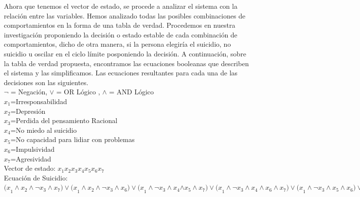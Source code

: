 {{{{{Ahora que tenemos el vector de estado, se procede a analizar el sistema con la relación entre las variables. Hemos analizado todas las posibles combinaciones de comportamientos en la forma de una tabla de verdad. Procedemos en nuestra investigación proponiendo la decisión o estado estable de cada combinación de comportamientos, dicho de otra manera, si la persona elegiría el suicidio, no suicidio u oscilar en el ciclo límite posponiendo la decisión. A continuación, sobre la tabla de verdad propuesta, encontramos las ecuaciones booleanas que describen el sistema y las simplificamos. Las ecuaciones resultantes para cada una de las decisiones son las siguientes.\\

$\neg$ = Negación, $\vee$ = OR Lógico , $\wedge$ = AND Lógico\\

$x_1$=Irresponsabilidad\\
$x_2$=Depresión\\
$x_3$=Perdida del pensamiento Racional\\
$x_4$=No miedo al suicidio\\
$x_5$=No capacidad para lidiar con problemas\\
$x_6$=Impulsividad\\
$x_7$=Agresividad\\

Vector de estado: $x_1x_2x_3x_4x_5x_6x_7$\\

Ecuación de Suicidio:
${ (x }_{ 1 }\wedge { x }_{ 2 }\wedge { \neg x }_{ 3 }\wedge { x }_{ 7 })\vee { (x }_{ 1 }\wedge { x }_{ 2 }\wedge { \neg x }_{ 3 }\wedge { x }_{ 6 })\vee { (x }_{ 1 }\wedge { \neg x }_{ 3 }\wedge { x }_{ 4 }{ \wedge x }_{ 5 }\wedge { x }_{ 7 })\vee { (x }_{ 1 }\wedge { \neg x }_{ 3 }\wedge { x }_{ 4 }\wedge { x }_{ 6 }\wedge { x }_{ 7 })\vee { (x }_{ 1 }\wedge { \neg x }_{ 3 }\wedge { x }_{ 5 }\wedge { x }_{ 6 })\vee { (x }_{ 2 }\wedge { \neg x }_{ 3 }\wedge { x }_{ 4 }\wedge { x }_{ 5 })\vee { (x }_{ 2 }\wedge { \neg x }_{ 3 }\wedge { x }_{ 4 }\wedge { x }_{ 6 })\vee { (x }_{ 2 }\wedge { \neg x }_{ 3 }\wedge { x }_{ 4 }\wedge { x }_{ 6 })\vee { (x }_{ 2 }\wedge { \neg x }_{ 3 }\wedge { x }_{ 5 }\wedge { x }_{ 6 })\vee ({ \neg x }_{ 3 }\wedge { x }_{ 4 }\wedge { x }_{ 5 }\wedge { x }_{ 6 })$\\


}}}}}
